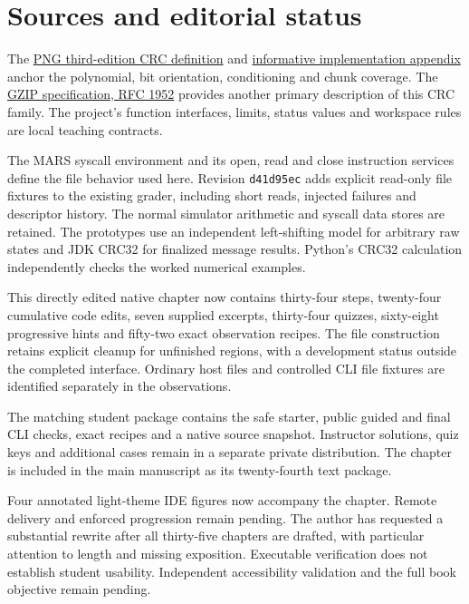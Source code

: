 \section*{Sources and editorial status}
The \href{https://www.w3.org/TR/2025/REC-png-3-20250624/\#5CRC-algorithm}{PNG third-edition CRC definition}
and \href{https://www.w3.org/TR/2025/REC-png-3-20250624/\#D-CRCAppendix}{informative implementation appendix}
anchor the polynomial, bit orientation, conditioning and chunk coverage. The
\href{https://www.rfc-editor.org/rfc/rfc1952.html}{GZIP specification, RFC 1952}
provides another primary description of this CRC family. The project's function
interfaces, limits, status values and workspace rules are local teaching contracts.

The MARS syscall environment and its open, read and close instruction services define
the file behavior used here. Revision \texttt{d41d95ec} adds explicit read-only file
fixtures to the existing grader, including short reads, injected failures and descriptor
history. The normal simulator arithmetic and syscall data stores are retained.
The prototypes use an independent left-shifting model for arbitrary raw states and
JDK CRC32 for finalized message results. Python's CRC32 calculation independently
checks the worked numerical examples.

This directly edited native chapter now contains thirty-four steps, twenty-four
cumulative code edits, seven supplied excerpts, thirty-four quizzes, sixty-eight
progressive hints and fifty-two exact observation recipes. The file construction
retains explicit cleanup for unfinished regions, with a development status outside
the completed interface. Ordinary host files and controlled CLI file fixtures are
identified separately in the observations.

The matching student package contains the safe starter, public guided and final CLI
checks, exact recipes and a native source snapshot. Instructor solutions, quiz keys and
additional cases remain in a separate private distribution. The chapter is included in
the main manuscript as its twenty-fourth text package.

Four annotated light-theme IDE figures now accompany the chapter. Remote delivery
and enforced progression remain pending.
The author has requested a substantial rewrite after all thirty-five chapters are
drafted, with particular attention to length and missing exposition. Executable
verification does not establish student usability. Independent accessibility validation
and the full book objective remain pending.
